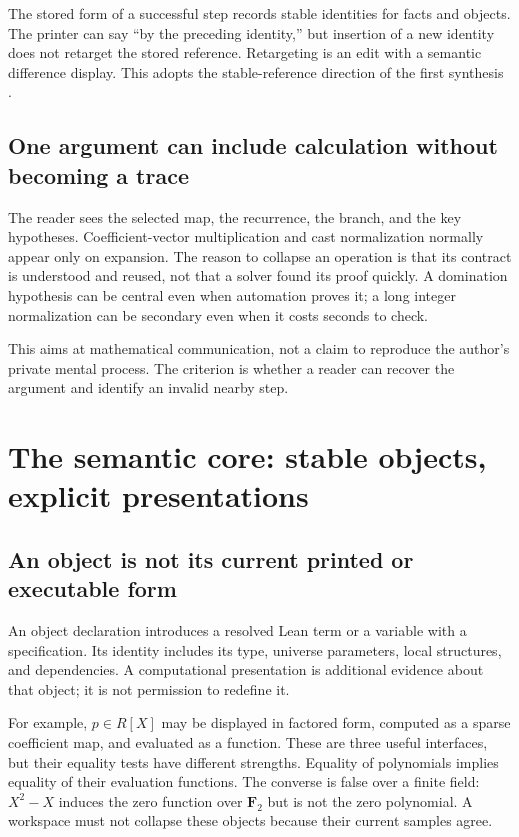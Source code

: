 \documentclass[11pt,letterpaper]{article}
\numberwithin{equation}{section}
\begin{document}
The stored form of a successful step records stable identities for facts and
objects. The printer can say ``by the preceding identity,'' but insertion of a
new identity does not retarget the stored reference. Retargeting is an edit with
a semantic difference display. This adopts the stable-reference direction of
the first synthesis \cite{synthesis}.

\subsection{One argument can include calculation without becoming a trace}
The reader sees the selected map, the recurrence, the branch, and the key
hypotheses. Coefficient-vector multiplication and cast normalization normally
appear only on expansion. The reason to collapse an operation is that its
contract is understood and reused, not that a solver found its proof quickly.
A domination hypothesis can be central even when automation proves it; a long
integer normalization can be secondary even when it costs seconds to check.

This aims at mathematical communication, not a claim to reproduce the author's
private mental process. The criterion is whether a reader can recover the
argument and identify an invalid nearby step.

\section{The semantic core: stable objects, explicit presentations}\label{sec:present}
\subsection{An object is not its current printed or executable form}
An object declaration introduces a resolved Lean term or a variable with a
specification. Its identity includes its type, universe parameters, local
structures, and dependencies. A computational presentation is additional evidence
about that object; it is not permission to redefine it.

For example, $p\in R[X]$ may be displayed in factored form, computed as a sparse
coefficient map, and evaluated as a function. These are three useful interfaces,
but their equality tests have different strengths. Equality of polynomials
implies equality of their evaluation functions. The converse is false over a
finite field: $X^2-X$ induces the zero function over $\mathbf F_2$ but is not the
zero polynomial. A workspace must not collapse these objects because their
current samples agree.
\end{document}
